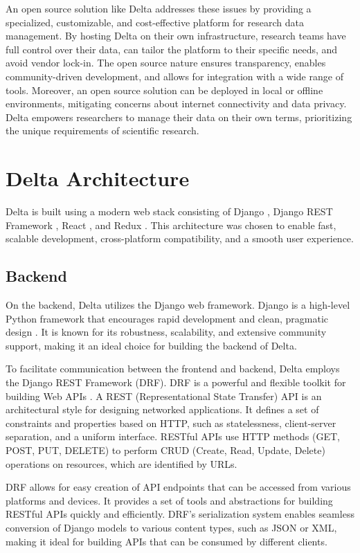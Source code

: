 \documentclass[conference]{IEEEtran}
\begin{document}
An open source solution like Delta addresses these issues by providing a specialized, customizable, and cost-effective platform for research data management. By hosting Delta on their own infrastructure, research teams have full control over their data, can tailor the platform to their specific needs, and avoid vendor lock-in. The open source nature ensures transparency, enables community-driven development, and allows for integration with a wide range of tools. Moreover, an open source solution can be deployed in local or offline environments, mitigating concerns about internet connectivity and data privacy. Delta empowers researchers to manage their data on their own terms, prioritizing the unique requirements of scientific research.

\section{Delta Architecture}
Delta is built using a modern web stack consisting of Django \cite{django}, Django REST Framework \cite{djangorest}, React \cite{react}, and Redux \cite{redux}. This architecture was chosen to enable fast, scalable development, cross-platform compatibility, and a smooth user experience.

\subsection{Backend}

On the backend, Delta utilizes the Django web framework. Django is a high-level Python framework that encourages rapid development and clean, pragmatic design \cite{django}. It is known for its robustness, scalability, and extensive community support, making it an ideal choice for building the backend of Delta.

To facilitate communication between the frontend and backend, Delta employs the Django REST Framework (DRF). DRF is a powerful and flexible toolkit for building Web APIs \cite{djangorest}. A REST (Representational State Transfer) API is an architectural style for designing networked applications. It defines a set of constraints and properties based on HTTP, such as statelessness, client-server separation, and a uniform interface. RESTful APIs use HTTP methods (GET, POST, PUT, DELETE) to perform CRUD (Create, Read, Update, Delete) operations on resources, which are identified by URLs.

DRF allows for easy creation of API endpoints that can be accessed from various platforms and devices. It provides a set of tools and abstractions for building RESTful APIs quickly and efficiently. DRF's serialization system enables seamless conversion of Django models to various content types, such as JSON or XML, making it ideal for building APIs that can be consumed by different clients.
\end{document}
